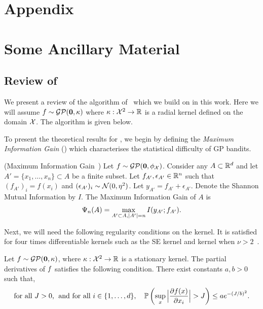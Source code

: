 \section*{\Large Appendix}
\vspace{0.1in}

\section{Some Ancillary Material}
\label{sec:ancillary}

\subsection{Review of \gpucb}
\label{sec:gpucbReview}

We present a review of the \gpucbs algorithm of~\citet{srinivas10gpbandits} which we build
on in this work.
Here we will assume $\func\sim\GP(\zero,\kernel)$ where $\kernel:\Xcal^2\rightarrow\RR$ is
a radial kernel defined on the domain $\Xcal$.
The algorithm is given below.

\insertAlgorithmGPBALGO

To present the theoretical results for \gpucb, we begin
by defining the \emph{Maximum Information Gain} (\mig) which characterises the
statistical difficulty of GP bandits.

\begin{definition}(Maximum Information Gain~\citep{srinivas10gpbandits})
Let $f\sim \GP(\zero, \phix)$.
Consider any $A\subset\RR^d$ and
let $A' = \{x_1, \dots, x_n\} \subset A$ be a finite subset.
Let $f_{A'}, \epsilon_{A'}\in\RR^n$ such that $(f_{A'})_i=f(x_i)$ and
$(\epsilon_{A'})_i\sim\Ncal(0,\eta^2)$.
Let $y_{A'} = f_{A'}+\epsilon_{A'}$.
Denote the Shannon Mutual Information by $I$.
The Maximum Information Gain of $A$ is
\[
\IG_n(A) = \max_{A'\subset A, |A'| = n} I(y_{A'}; f_{A'}).
\]
\label{def:infGain}
\end{definition}
\insertpostspacing

Next, we will need the following regularity conditions on the kernel.
It is satisfied for four times differentiable
kernels such as the SE kernel and \matern{} kernel when
$\nu>2$~\citep{ghosal06gpconsistency}.

\begin{assumption} Let $\func\sim\GP(\zero,\kernel)$, where
$\kernel:\Xcal^2 \rightarrow \RR$ is a stationary kernel.
The partial derivatives
of $\func$  satisfies the following condition.
There exist constants $a, b >0$ such that,
\[
\text{for all $J>0$, $\;$and for all $i \in \{1,\dots,d\}$},\quad \PP\left( \sup_{x} 
\Big|\partialfrac{x_i}{\func(x)}\Big| > J \right)
\leq a e^{-(J/b)^2}.
\]
\label{asm:kernelAssumption}
\end{assumption}

